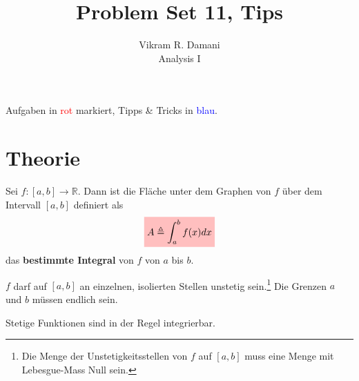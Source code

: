 \documentclass[12pt]{article}
\newcommand{\R}{\mathbb{R}} %
\newenvironment{definition}[2][Definition]{\begin{trivlist}
        \item[\hskip \labelsep {\bfseries #1}\hskip \labelsep {\bfseries #2.}]}{\flushright{$\square$}\end{trivlist}}
\newenvironment{remark}[2][Bemerkung]{\begin{trivlist}
        \item[\hskip \labelsep {\bfseries #1}\hskip \labelsep {\bfseries #2.}]}{\end{trivlist}}
\begin{document}
\title{Problem Set 11, Tips}
\author{Vikram R. Damani\\
    Analysis I}

\maketitle
Aufgaben in \textcolor{red}{rot} markiert, Tipps \& Tricks in \textcolor{blue}{blau}.

\section{Theorie}

\begin{definition}{[Bestimmtes Integral]}
    Sei $f: [a,b] \to \R$. Dann ist die Fläche unter dem Graphen von $f$ über dem Intervall $[a,b]$ definiert als
    \begin{align}
        \colorbox{pink}{\mathstrut$A\triangleq\displaystyle\int_{a}^{b}f(x)dx$}
    \end{align}
    das \textbf{bestimmte Integral} von $f$ von $a$ bis $b$.

    \begin{remark}{[Bedingungen für Konvergenz]}
        $f$ darf auf $[a,b]$ an einzelnen, isolierten Stellen unstetig sein.\footnote{Die Menge der Unstetigkeitsstellen von $f$ auf $[a,b]$ muss eine Menge mit Lebesgue-Mass Null sein.} Die Grenzen $a$ und $b$ müssen endlich sein.

        Stetige Funktionen sind in der Regel integrierbar.
    \end{remark}
\end{definition}
\end{document}
